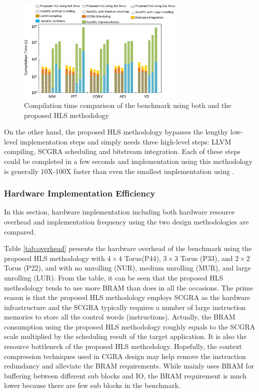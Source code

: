 \begin{figure}[h]
\centering
\includegraphics[width=8cm]{designtime}
\vspace{-1em}
\caption{Compilation time comparison of the benchmark using both \autoesl and the proposed HLS methodology}
\label{fig:designtime}
\vspace{-1em}
\end{figure} 

On the other hand, the proposed HLS methodology bypasses the lengthy low-level implementation steps and simply needs three high-level steps: LLVM compiling, SCGRA scheduling and bitstream integration. Each of these steps could be completed in a few seconds and implementation using this methodology is generally 10X-100X faster than even the smallest implementation using \autoesl.

\subsubsection{Hardware Implementation Efficiency}
In this section, hardware implementation including both hardware resource overhead and implementation frequency using the two design methodologies are compared.

Table \ref{tab:overhead} presents the hardware overhead of the benchmark using the proposed HLS methodology with $4 \times4$ Torus(P44), $3 \times 3$ Torus (P33), and $2 \times 2$ Torus (P22), and \autoesl with no unrolling (NUR), medium unrolling (MUR), and large unrolling (LUR). From the table, it can be seen that the proposed HLS methodology tends to use more BRAM than \autoesl does in all the occasions. The prime reason is that the proposed HLS methodology employs SCGRA as the hardware infrastructure and the SCGRA typically requires a number of large instruction memories to store all the control words (instructions). Actually, the BRAM consumption using the proposed HLS methodology roughly equals to the SCGRA scale multiplied by the scheduling result of the target application. It is also the resource bottleneck of the proposed HLS methodology. Hopefully, the context compression techniques \cite{kim2010dynamic} used in CGRA design may help remove the instruction redundancy and alleviate the BRAM requirements. While \autoesl mainly uses BRAM for buffering between different sub blocks and IO, the BRAM requirement is much lower because there are few sub blocks in the benchmark. 


